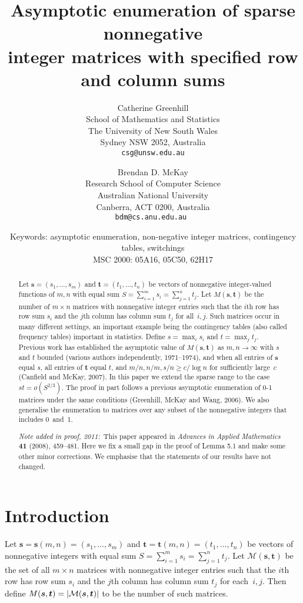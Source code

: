 \documentclass[12pt]{article}
\title{Asymptotic enumeration of sparse nonnegative\\
integer matrices with specified row and column sums}
\author{
Catherine Greenhill\\
\small School of Mathematics and Statistics\\[-0.5ex]
\small The University of New South Wales\\[-0.5ex]
\small Sydney NSW 2052, Australia\\[-0.5ex]
\small \tt csg@unsw.edu.au\\
\and
Brendan D. McKay\\
\small Research School of Computer Science\\[-0.5ex]
\small Australian National University\\[-0.5ex]
\small Canberra, ACT 0200, Australia\\
\small\tt bdm@cs.anu.edu.au
}
\date{\small Keywords:  asymptotic enumeration, non-negative integer matrices,
              contingency tables, switchings\\
MSC 2000: 05A16, 05C50, 62H17}
\numberwithin{equation}{section}
\def\M{{\mathcal{M}}}
\def\svec{{\boldsymbol{s}}}
\def\tvec{{\boldsymbol{t}}}
\def\Mst{{\M(\svec,\tvec)}}
\begin{document}
\maketitle

\begin{abstract}
Let $\svec = (s_1,\ldots ,s_m)$ and $\tvec = (t_1,\ldots ,t_n)$
be vectors of nonnegative integer-valued functions of $m,n$ with
equal sum $S = \sum_{i=1}^m s_i = \sum_{j=1}^n t_j$.
Let $M(\svec,\tvec)$ be the number of $m\times n$ matrices
with nonnegative integer entries such that the
$i$th row has row sum $s_i$ and the $j$th column has
column sum $t_j$ for all~$i,j$.
Such matrices occur in many different settings, an important example
being the contingency tables (also called frequency
tables) important in statistics.
Define $s=\max_i s_i$ and $t=\max_j t_j$.
Previous work has established the asymptotic value of
$M(\svec,\tvec)$ as $m,n\to\infty$ with
$s$ and $t$ bounded (various authors independently,
1971--1974), and when
all entries of $\svec$ equal $s$, all entries of $\tvec$
equal $t$, and
$m/n,n/m,s/n\ge c/\log n$ for sufficiently large~$c$ (Canfield
and McKay, 2007).  In this paper we extend the sparse range to
the case $st=o(S^{2/3})$.  The proof in part follows a previous
asymptotic enumeration of 0-1 matrices under the same conditions
(Greenhill, McKay and Wang, 2006).
We also generalise the enumeration
to matrices over any subset of
the nonnegative integers that includes 0~and~1.

\emph{Note added in proof, 2011:}\  This paper appeared in
\emph{Advances in Applied Mathematics} {\bf 41} (2008), 459--481.
Here we fix a small gap in the proof of Lemma 5.1 and
make some other minor corrections.
We emphasise that the statements of our results have not changed.  
\end{abstract}

\section{Introduction}

Let $\svec = \svec(m,n) = (s_1,\ldots ,s_m)$
and $\tvec = \tvec(m,n) = (t_1,\ldots ,t_n)$
be vectors of nonnegative integers with
equal sum $S = \sum_{i=1}^m s_i = \sum_{j=1}^n t_j$.
Let $\Mst$ be the set of all $m\times n$ matrices
with nonnegative integer entries such that the
$i$th row has row sum $s_i$ and the $j$th column has
column sum $t_j$ for each~$i,j$.
Then define $M(\svec,\tvec) = \card{\Mst}$ to be the number of
such matrices.
\end{document}
